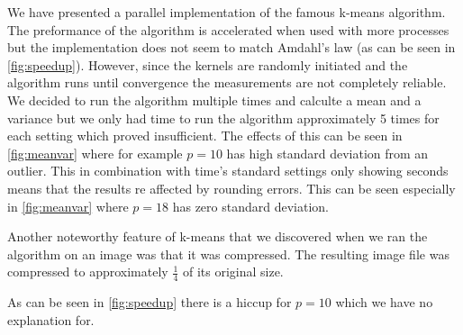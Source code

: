 
We have presented a parallel implementation of the famous k-means algorithm. The preformance of the algorithm is accelerated when used with more processes but the implementation does not seem to match Amdahl's law (as can be seen in \cref{fig:speedup}). However, since the kernels are randomly initiated and the algorithm runs until convergence the measurements are not completely reliable. We decided to run the algorithm multiple times and calculte a mean and a variance but we only had time to run the algorithm approximately 5 times for each setting which proved insufficient. The effects of this can be seen in \cref{fig:meanvar} where for example $p=10$ has high standard deviation from an outlier. This in combination with time's standard settings only showing seconds means that the results re affected by rounding errors. This can be seen especially in \cref{fig:meanvar} where $p=18$ has zero standard deviation.

Another noteworthy feature of k-means that we discovered when we ran the algorithm on an image was that it was compressed. The resulting image file was compressed to approximately $\frac{1}{4}$ of its original size.

As can be seen in \cref{fig:speedup} there is a hiccup for $p=10$ which we have no explanation for.
